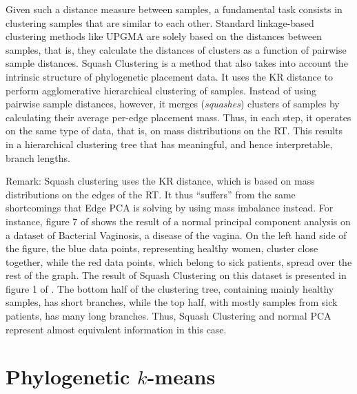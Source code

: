 Given such a distance measure between samples,
a fundamental task consists in clustering samples that are similar to each other.
Standard linkage-based clustering methods like \mbox{UPGMA} %
\cite{Michener1957,Sokal1958,Legendre1998} are solely based on the distances between samples,
that is, they calculate the distances of clusters as a function of pairwise sample distances.
Squash Clustering \cite{Matsen2011a,Srinivasan2012} is a method that
also takes into account the intrinsic structure of phylogenetic placement data.
It uses the KR distance to perform agglomerative hierarchical clustering of samples.
Instead of using pairwise sample distances, however,
it merges (\emph{squashes}) clusters of samples by calculating their average per-edge placement mass.
Thus, in each step, it operates on the same type of data, that is, on mass distributions on the \ac{RT}.
This results in a hierarchical clustering tree that has meaningful, and hence interpretable, branch lengths.

Remark:
Squash clustering uses the KR distance, which is based on mass distributions on the edges of the \ac{RT}.
It thus ``suffers'' from the same shortcomings that Edge PCA is solving by using mass imbalance instead.
For instance, figure 7 of \cite{Matsen2011a} shows the result of a normal principal component analysis
on a dataset of Bacterial Vaginosis, a disease of the vagina.
On the left hand side of the figure, the blue data points, representing healthy women, cluster close together,
while the red data points, which belong to sick patients, spread over the rest of the graph.
The result of Squash Clustering on this dataset is presented in figure 1 of \cite{Srinivasan2012}.
The bottom half of the clustering tree, containing mainly healthy samples, has short branches,
while the top half, with mostly samples from sick patients, has many long branches.
Thus, Squash Clustering and normal PCA represent almost equivalent information in this case.


\section{Phylogenetic \texorpdfstring{$k$-means}{k-means}}
\label{ch:Clustering:sec:PhylogeneticKmeans}

